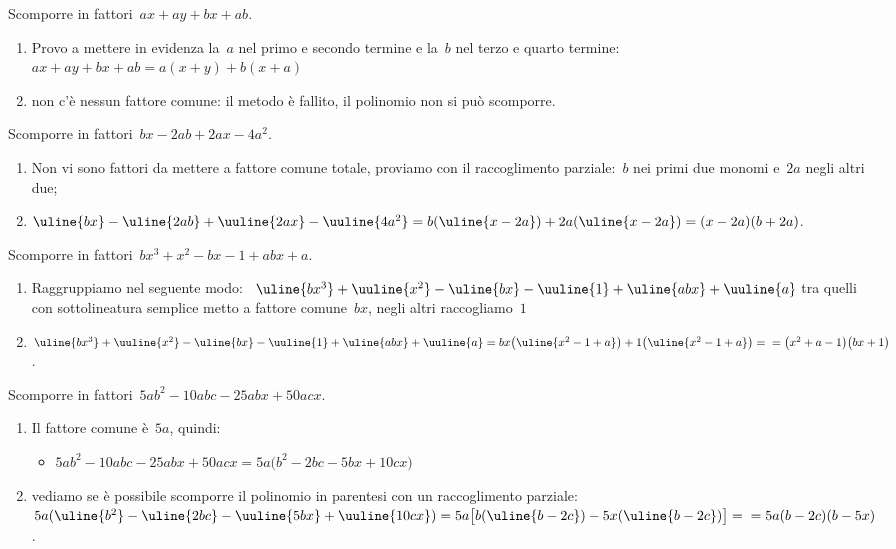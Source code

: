 \begin{esempio}{}{}
Scomporre in fattori~\(ax+ay+bx+ab\).
\begin{enumerate} [left=0mm, noitemsep]
\item Provo a mettere in evidenza la~\(a\) nel primo e secondo termine 
e la~\(b\) nel terzo e quarto termine:~\(ax+ay+bx+ab=a(x+y)+b(x+a)\)
\item non c'è nessun fattore comune: il metodo è fallito, il polinomio 
non si può scomporre.
\end{enumerate}
\end{esempio}


\begin{esempio}{}{}
Scomporre in fattori~\(bx-2ab+2ax-4a^{2}\).
\begin{enumerate} [left=0mm, noitemsep]
\item Non vi sono fattori da mettere a fattore comune totale, proviamo 
con il raccoglimento parziale:~\(b\) nei primi due monomi e~\(2a\) 
negli altri due;
\item \(\uline{bx} -\uline{2ab}+\uuline{2ax}-
  \uuline{4a^{2}}=
  b(\uline{x-2a})+2a(\uline{x-2a})=(x-2a)(b+2a)\).
\end{enumerate}
\end{esempio}

\begin{esempio}{}{}
Scomporre in fattori~\(bx^3+x^2-bx-1+abx+a\).
\begin{enumerate} [left=0mm, noitemsep]
\item Raggruppiamo nel seguente modo:~
\(\uline{bx^3}+\uuline{x^2}-\uline{bx}-
\uuline{1}+\uline{abx}+\uuline{a}\) 
tra quelli con sottolineatura semplice metto a fattore comune~\(bx\), 
negli altri raccogliamo~\(1\)
\item
\(\uline{bx^3}+\uuline{x^2}-\uline{bx}-
\uuline{1}+\uline{abx}+\uuline{a}=
bx\bigl(\uline{x^2-1+a}\bigr)+1\bigl(\uline{x^2-1+a}\bigr)=\newline
=\bigl(x^2+a-1\bigr)\bigl(bx+1\bigr)\).
\end{enumerate}
\end{esempio}

\begin{esempio}{}{}
Scomporre in fattori~\(5ab^{2}-10abc-25abx+50acx\).
\begin{enumerate} [left=0mm, noitemsep]
\item Il fattore comune è~\(5a\), quindi:
\begin{itemize}[nosep]
\item \(5ab^{2}-10abc-25abx+50acx=5a\bigl(b^{2}-2bc-5bx+10cx\bigr)\)
\end{itemize}
\item vediamo se è possibile scomporre il polinomio in parentesi con un 
raccoglimento parziale: \(5a(\uline{b^{2}}-\uline{2bc}
-\uuline{5bx}+\uuline{10cx})=
5a\bigl[b(\uline{b-2c})-5x(\uline{b-2c})\bigr]=\newline
=5a(b-2c)(b-5x)\).
\end{enumerate}
\end{esempio}

